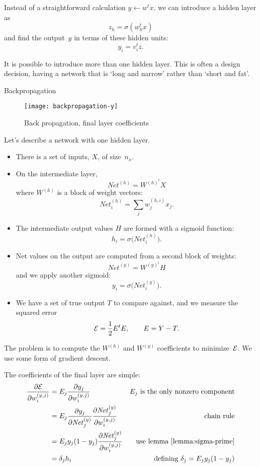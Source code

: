 Instead of a straightforward calculation $y\leftarrow w^tx$,
we can introduce a hidden layer as
\[ z_h = \sigma(w_h^tx) \]
and find the output~$y$ in terms of these hidden units:
\[ y_i = v_i^tz. \]

It is possible to introduce more than one hidden layer. This is often
a design decision, having a network that is `long and narrow' rather
than `short and fat'.

 {Backpropagation}

\begin{figure}[ht]
  \texttt{[image: backpropagation-y]}
  \caption{Back propagation, final layer coefficients}
  \label{fig:backprop-y}
\end{figure}

Let's describe a network with one hidden layer.
\def\net{\mathord{\mathit{Net}}}
\def\eE{{\cal E}}
\begin{itemize}
\item There is a set of inputs, $X$, of size~$n_x$.
\item On the intermediate layer,
  \[ \net^{(h)}= W^{ {(h)}^t }X \]
  where $W^{(h)}$ is a block of weight vectors:
  \[ \net^{(h)}_i = \sum_j w^{(h,i)}_jx_j. \]
\item The intermediate output values $H$ are formed with a sigmoid
  function:
  \[ h_i=\sigma\bigl(\net^{(h)}_i\bigr). \]
\item Net values on the output are computed from a second block of
  weights:
  \[ \net^{(y)}=W^{ {(y)}^t }H \]
  and we apply another sigmoid:
  \[ y_i=\sigma\bigl(\net^{(y)}_i\bigr). \]
\item We have a set of true output $T$ to compare against, and we
  measure the squared error
  \[ \eE=\frac12 E^tE,\qquad E=Y-T. \]
\end{itemize}

The problem is to compute the $W^{(h)}$ and $W^{(y)}$ coefficients to
minimize~$\eE$. We use some form of gradient descent.

The coefficients of the final layer are simple:
\begin{align}
  \frac{\partial\eE}{\partial w^{(y,j)}_i}
  &=E_j\frac{\partial y_j}{\partial w^{(y,j)}_i}
  &\hbox{$E_j$ is the only nonzero component}\\
  &=E_j \frac{\partial y_j}{\partial \net^{(y)}_j}
  \frac{\partial \net^{(y)}_j}{\partial w^{(y,j)}_i}
  &\hbox{chain rule}\\
  &=E_j y_j(1-y_j)
  \frac{\partial \net^{(y)}_j}{\partial w^{(y,j)}_i}
  &\hbox{use lemma~\ref{lemma:sigma-prime}}\\
  &=\delta_j h_i
  &\hbox{defining $\delta_j=E_jy_j(1-y_j)$}\\
\end{align}

